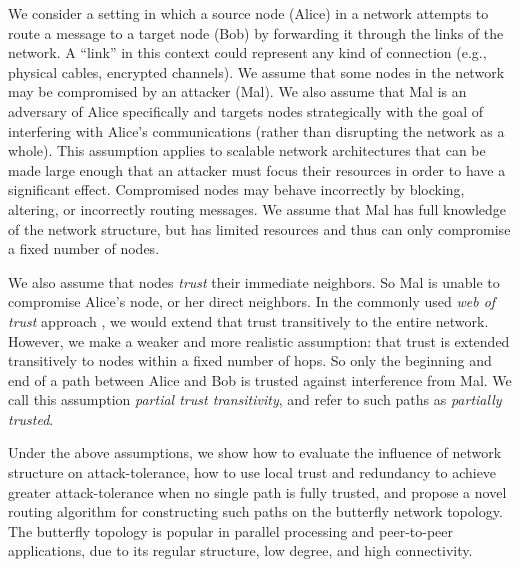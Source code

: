 \documentclass[twocolumn]{article}
\begin{document}
We consider a setting in which a source node (Alice)
in a network attempts to route a message
to a target node (Bob) by forwarding it through the links of the network.
A ``link'' in this context could represent any kind of connection
(e.g., physical cables, encrypted channels).
We assume that some nodes in the network may be compromised by an attacker
(Mal).
We also assume that Mal is an adversary of Alice specifically and targets
nodes strategically with the goal of interfering with Alice's communications
(rather than disrupting the network as a whole).
This assumption applies to scalable network architectures that can be made
large enough that an attacker must focus their resources in order to have
a significant effect.
Compromised nodes may behave incorrectly by blocking, altering,
or incorrectly routing messages.
We assume that Mal has full knowledge of the network structure, but has
limited resources and thus can only compromise a fixed number of nodes.

We also assume that nodes {\em trust} their immediate neighbors.
So Mal is unable to compromise Alice's node, or her direct neighbors.
In the commonly used {\em web of trust} approach
\cite{zimmermann_official_1995,ferguson_practical_2003},
we would extend that trust transitively to the entire network.
However, we make a weaker and more realistic assumption:
that trust is extended transitively to nodes within a fixed
number of hops.
So only the beginning and end of a path between Alice and Bob is trusted
against interference from Mal.
We call this assumption
{\em partial trust transitivity},
and refer to such paths as {\em partially trusted}.

Under the above assumptions,
we show how to evaluate the influence of network structure
on attack-tolerance,
how to use local trust and redundancy to achieve greater attack-tolerance
when no single path is fully trusted,
and propose a novel routing algorithm for constructing such paths on
the butterfly network topology.
The butterfly topology is popular in parallel processing
\cite{kshemkalyani_distributed_2008} and
peer-to-peer \cite{lua_survey_2005, korzun_structured_2013}
applications, due to its regular structure, low degree, and high connectivity.
\end{document}
